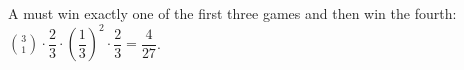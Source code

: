 A must win exactly one of the first three games and then win the fourth: $\binom31\cdot\dfrac23\cdot\left(\dfrac13\right)^2\cdot\dfrac23=\boxed{\dfrac4{27}}$.
